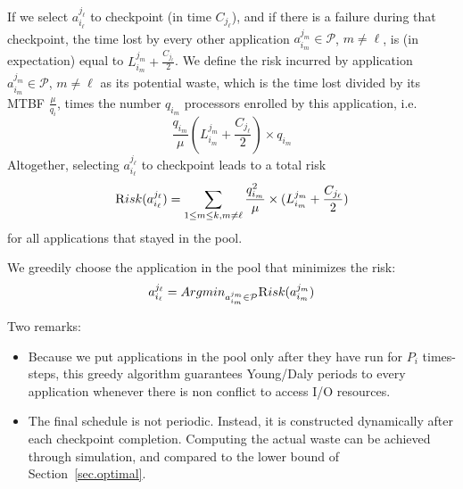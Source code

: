 \documentclass[conference]{IEEEtran}
\newcommand{\application}[2]{a_{#1}^{#2}}
\newcommand{\nbnodes}[1]{q_{#1}}
\newcommand{\period}[1]{P_{#1}}
\newcommand{\mtbfplat}{\mu}
\newcommand{\lastckpt}[2]{L_{#1}^{#2}}
\newcommand{\wastefct}[2]{W_{#1}(#2)}
\newcommand{\pool}{{\mathcal P}}
\newcommand{\risk}{{\textsc Risk}}
\begin{document}
If we select $\application{i_{\ell}}{j_{\ell}}$ to checkpoint (in time $C_{j_{\ell}}$),
and if there is a failure during that checkpoint, the time lost by every other application
$\application{i_{m}}{j_{m}} \in \pool$, $m \neq \ell$, is (in expectation) equal to
 $\lastckpt{i_m}{j_m} + \frac{C_{j_{\ell}}}{2}$.
We define the risk incurred by application
$\application{i_{m}}{j_{m}} \in \pool$, $m \neq \ell$
as its potential waste, which is the time lost divided by its MTBF $\frac{\mtbfplat}{\nbnodes{i}}$,
times the number $\nbnodes{i_m}$ processors enrolled by this application, i.e.
$$ \frac{\nbnodes{i_{m}}}{\mtbfplat}  (\lastckpt{i_m}{j_m} + \frac{C_{j_{\ell}}}{2})
\times \nbnodes{i_m} $$
Altogether, selecting $\application{i_{\ell}}{j_{\ell}}$ to checkpoint leads to a total risk
$$\risk(\application{i_{\ell}}{j_{\ell}}) = \sum_{1 \leq m \leq k, m \neq \ell} \frac{\nbnodes{i_{m}}^{2}}{\mtbfplat}  \times (\lastckpt{i_m}{j_m} + \frac{C_{j_{\ell}}}{2})$$
  for all applications that stayed in the pool.

We greedily choose the application in the pool that minimizes the risk:
$$\application{i_{\ell}}{j_{\ell}} = Argmin_{\application{i_m}{j_m} \in \pool} \risk(\application{i_m}{j_m})$$


Two remarks:
\begin{itemize}
\item Because we put applications in the pool only after they have run for $P_{i}$ times-steps,
this greedy algorithm guarantees Young/Daly periods to every application
whenever there is non conflict to access I/O resources.
\item The final schedule is not periodic. Instead, it is constructed dynamically
after each checkpoint completion. Computing the actual waste can be achieved
through simulation, and compared to the lower bound of Section~\ref{sec.optimal}.
\end{itemize}
\end{document}
